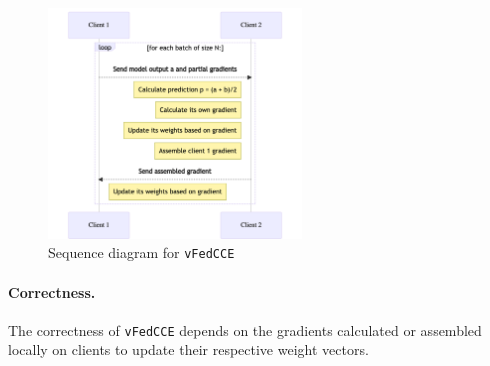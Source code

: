 \documentclass{article}
\begin{document}
\begin{figure}
  \centering
  \includegraphics[width=0.6\textwidth]{./images/vfedcce_diagram2.png}
  \caption{Sequence diagram for \texttt{vFedCCE}}
  \label{vflseqdia}
\end{figure}

\paragraph{Correctness.} The correctness of \texttt{vFedCCE} depends on the gradients calculated or assembled locally on clients to update their respective weight vectors.
\end{document}
